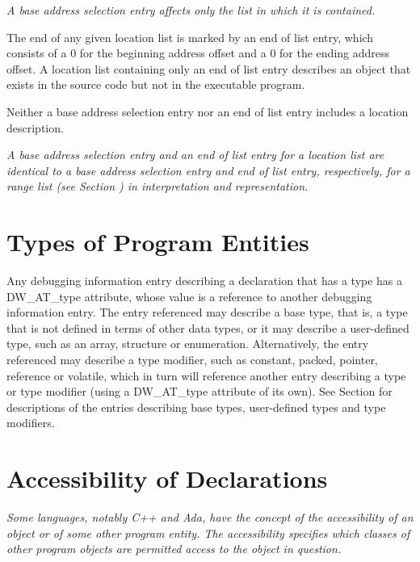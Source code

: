 \textit{A base address selection entry 
affects only the list in which it is contained.}

The end of any given location list is marked by an end of
list entry, which consists of a 0 for the beginning address
offset and a 0 for the ending address offset. A location list
containing only an end of list entry describes an object that
exists in the source code but not in the executable program.

Neither a base address selection entry nor an end of list
entry includes a location description.

\textit{A base address selection entry and an end of list
entry for a location list are identical to a base address
selection entry and end of list entry, respectively, for a
range list 
(see Section ) 
in interpretation
and representation.}






\section{Types of Program Entities}
\label{chap:typesofprogramentities}
Any debugging information entry describing a declaration that
has a type has a DW\-\_AT\-\_type attribute, whose value is a
reference to another debugging information entry. The entry
referenced may describe a base type, that is, a type that is
not defined in terms of other data types, or it may describe a
user-defined type, such as an array, structure or enumeration.
Alternatively, the entry referenced may describe a type
modifier, such as constant, packed, pointer, reference or
volatile, which in turn will reference another entry describing
a type or type modifier (using a DW\-\_AT\-\_type attribute of its
own). See 
Section   
for descriptions of the entries describing
base types, user-defined types and type modifiers.



\section{Accessibility of Declarations}
\label{chap:accessibilityofdeclarations}
\textit{Some languages, notably C++ and Ada, have the concept of
the accessibility of an object or of some other program
entity. The accessibility specifies which classes of other
program objects are permitted access to the object in question.}

